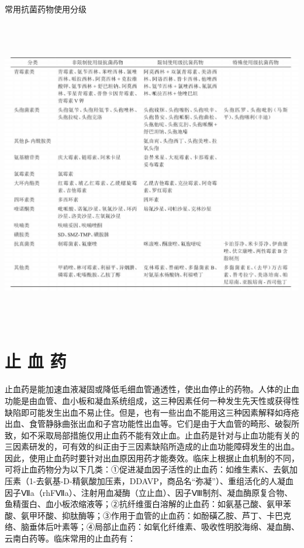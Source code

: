 \begin{table}[htbp]
\centering
\caption{常用抗菌药物使用分级}
\label{tab154-13}
\includegraphics[width=6.78125in,height=5.35417in]{./images/Image00604.jpg}
\end{table}

\protect\hypertarget{text00438.html}{}{}

\chapter{止 血 药}

止血药是能加速血液凝固或降低毛细血管通透性，使出血停止的药物。人体的止血功能是由血管、血小板和凝血系统组成，这三种因素任何一种发生先天性或获得性缺陷即可能发生出血不易止住。但是，也有一些出血不能用这三种因素解释如痔疮出血、食管静脉曲张出血和子宫功能性出血等。它们是由于大血管的畸形、破裂所致，如不采取局部措施仅用止血药不能有效止血。止血药是针对与止血功能有关的三因素研发的，可有效的纠正由于三因素缺陷所造成的止血功能障碍发生的出血。因此，使用止血药时要针对出血原因用药才能奏效。临床上根据止血机制的不同，可将止血药物分为以下几类：①促进凝血因子活性的止血药：如维生素K、去氨加压素（1-去氨基-D-精氨酸加压素，DDAVP，商品名“弥凝”）、重组活化的人凝血因子Ⅶa（rhFⅦa）、注射用血凝酶（立止血）、因子Ⅷ制剂、凝血酶原复合物、鱼精蛋白、血小板浓缩液等；②抗纤维蛋白溶解的止血药：如氨基己酸、氨甲苯酸、氨甲环酸、抑肽酶等；③作用于血管的止血药：如酚磺乙胺、芦丁、卡巴克络、脑垂体后叶素等；④局部止血药：如氧化纤维素、吸收性明胶海绵、凝血酶、云南白药等。临床常用的止血药有：

